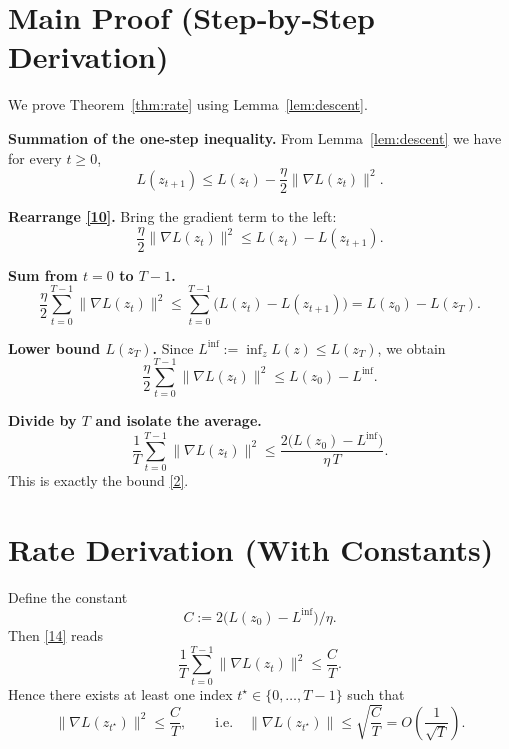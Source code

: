 \documentclass{article}
\begin{document}
\section*{Main Proof (Step‑by‑Step Derivation)}
We prove Theorem~\ref{thm:rate} using Lemma~\ref{lem:descent}.

\begin{enumerate}[label={[\arabic*]},leftmargin=*,itemsep=2pt]
\item \textbf{Summation of the one‑step inequality.}  
From Lemma~\ref{lem:descent} we have for every $t\ge0$,
\[
L(z_{t+1})\le L(z_t)-\frac{\eta}{2}\|\nabla L(z_t)\|^{2}.
\tag{10}
\]
\item \textbf{Rearrange \eqref{10}.}  
Bring the gradient term to the left:
\[
\frac{\eta}{2}\|\nabla L(z_t)\|^{2}\le L(z_t)-L(z_{t+1}).
\tag{11}
\]
\item \textbf{Sum from $t=0$ to $T-1$.}  
\[
\frac{\eta}{2}\sum_{t=0}^{T-1}\|\nabla L(z_t)\|^{2}
\le \sum_{t=0}^{T-1}\bigl(L(z_t)-L(z_{t+1})\bigr)
= L(z_0)-L(z_T).
\tag{12}
\]
\item \textbf{Lower bound $L(z_T)$.}  
Since $L^\inf:=\inf_{z}L(z)\le L(z_T)$, we obtain
\[
\frac{\eta}{2}\sum_{t=0}^{T-1}\|\nabla L(z_t)\|^{2}
\le L(z_0)-L^\inf.
\tag{13}
\]
\item \textbf{Divide by $T$ and isolate the average.}
\[
\frac{1}{T}\sum_{t=0}^{T-1}\|\nabla L(z_t)\|^{2}
\le \frac{2\bigl(L(z_0)-L^\inf\bigr)}{\eta\,T}.
\tag{14}
\]
This is exactly the bound \eqref{2}. \qedhere
\end{enumerate}

\section*{Rate Derivation (With Constants)}
Define the constant
\[
C:=2\bigl(L(z_0)-L^\inf\bigr)/\eta .
\]
Then \eqref{14} reads
\[
\frac{1}{T}\sum_{t=0}^{T-1}\|\nabla L(z_t)\|^{2}\le \frac{C}{T}.
\]
Hence there exists at least one index $t^\star\in\{0,\dots,T-1\}$ such that
\[
\|\nabla L(z_{t^\star})\|^{2}\le \frac{C}{T},
\qquad\text{i.e.}\quad
\|\nabla L(z_{t^\star})\|\le \sqrt{\frac{C}{T}}
=O\!\left(\frac{1}{\sqrt{T}}\right).
\]
\end{document}
